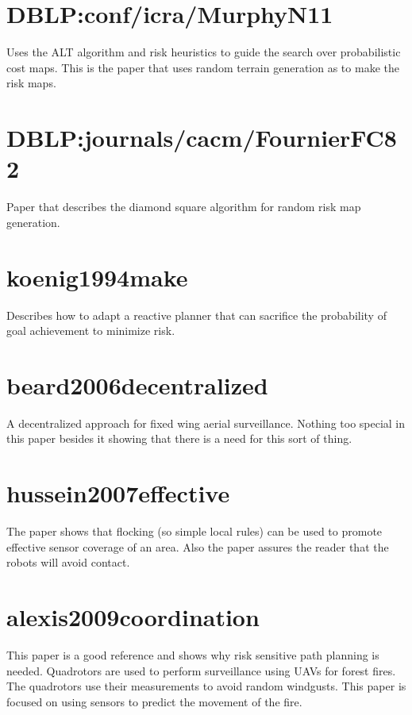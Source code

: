 \documentclass{article}
\begin{document}
\section{DBLP:conf/icra/MurphyN11~\cite{DBLP:conf/icra/MurphyN11}}

Uses the ALT algorithm and risk heuristics to guide the search over
probabilistic cost maps. This is the paper that uses random terrain generation
as to make the risk maps.

\section{DBLP:journals/cacm/FournierFC82~\cite{DBLP:journals/cacm/FournierFC82}}

Paper that describes the diamond square algorithm for random risk map
generation.

\section{koenig1994make \cite{koenig1994make}}

Describes how to adapt a reactive planner that can sacrifice the probability of
goal achievement to minimize risk.

\section{beard2006decentralized~\cite{beard2006decentralized}}

A decentralized approach for fixed wing aerial surveillance. Nothing too
special in this paper besides it showing that there is a need for this sort of
thing.

\section{hussein2007effective~\cite{hussein2007effective}}

The paper shows that flocking (so simple local rules) can be used to promote
effective sensor coverage of an area. Also the paper assures the reader that
the robots will avoid contact.

\section{alexis2009coordination~\cite{alexis2009coordination}}

This paper is a good reference and shows why risk sensitive path planning is
needed. Quadrotors are used to perform surveillance using UAVs for forest
fires. The quadrotors use their measurements to avoid random windgusts. This
paper is focused on using sensors to predict the movement of the fire.
\end{document}

